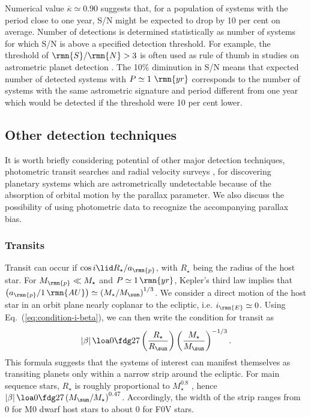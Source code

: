 \documentclass[fleqn,usenatbib,useAMS,usedcolumn]{mnras}
\begin{document}
Numerical value $\overline{\kappa}\simeq0.90$ suggests that, for a population of systems with the period close to one year, S/N might be expected to drop by 10 per cent on average. Number of detections is determined statistically as number of systems for which S/N is above a specified detection threshold. For example, the threshold of $\rmn{S}/\rmn{N}>3$ is often used as rule of thumb in studies on astrometric planet detection \citep{Perryman+2014,Sozzetti+2014,2017arXiv1704.02493}. The 10\% diminution in S/N means that expected number of detected systems with $P\simeq1~\rmn{yr}$ corresponds to the number of systems with the same astrometric signature and period different from one year which would be detected if the threshold were 10 per cent lower.

\subsection{Other detection techniques }

It is worth briefly considering potential of other major detection techniques, photometric transit searches and radial velocity surveys \citep{Perryman2011}, for discovering planetary systems which are astrometrically undetectable because of the absorption of orbital motion by the parallax parameter. We also discuss the possibility of using photometric data to recognize the accompanying parallax bias.

\subsubsection{Transits}

Transit can occur if $\cos i\lid R_\star/a_\rmn{p}$, with $R_\star$ being the radius of the host star. For $M_\rmn{p}\ll M_\star$ and $P\simeq1\,\rmn{yr}$, Kepler's third law implies that $\left(a_\rmn{p}/1\,\rmn{AU}\right)\simeq\left(M_\star/M_{\sun}\right)^{1/3}$. We consider a direct motion of the host star in an orbit plane nearly coplanar to the ecliptic, i.e. $i_\rmn{E}\simeq0$. Using Eq.~(\ref{eq:condition-i-beta}), we can then write the condition for transit as
\begin{equation}
  \left|\beta\right|\loa 0\fdg27\left(\frac{R_\star}{R_{\sun}}\right)\left(\frac{M_\star}{M_{\sun}}\right)^{-1/3}.
\end{equation}
This formula suggests that the systems of interest can manifest themselves as transiting planets only within a narrow strip around the ecliptic. For main sequence stars, $R_\star$ is roughly proportional to $M_\star^{0.8}$ \citep[][Ch.~15]{Cox2000}, hence $\left|\beta\right|\loa0\fdg27\left(M_{\sun}/M_\star\right)^{0.47}$. Accordingly,
the width of the strip ranges from 0 for M0 dwarf host stars to about 0 for F0V stars.
\end{document}
